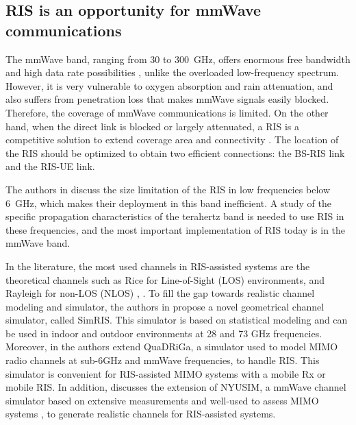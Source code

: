 \documentclass[conference]{IEEEtran}
\begin{document}


 

\subsection{RIS is an opportunity for mmWave communications}
The mmWave band, ranging from 30 to 300~GHz, offers enormous free bandwidth and high data rate possibilities  \cite{9350499}, unlike the overloaded low-frequency spectrum. However, it is very vulnerable to oxygen absorption and rain attenuation, and also suffers from penetration loss that makes mmWave signals easily blocked. Therefore, the coverage of mmWave communications is limited\cite{9568459}. On the other hand,  when the direct link is blocked or largely attenuated, a RIS is a competitive solution to extend  coverage area and connectivity \cite{9201413}. The location of the RIS should be optimized to obtain two efficient connections: the BS-RIS link and the RIS-UE link. 

The authors in \cite{9824117} discuss the size limitation of the RIS in low frequencies below 6~GHz, which makes their deployment in this band inefficient. A study of the specific propagation characteristics of the terahertz  band is needed to use RIS in these frequencies, and the most important implementation of RIS today is in the mmWave band. 
 
In the literature, the most used channels in RIS-assisted systems are the theoretical channels  such as Rice for Line-of-Sight (LOS) environments, and Rayleigh for non-LOS (NLOS) \cite{8982186}, \cite{9738798}. To fill the gap towards realistic channel modeling and simulator, the authors in \cite{9397266}  propose a novel geometrical  channel simulator, called SimRIS. This simulator is based on statistical modeling and can be used in indoor and outdoor environments at 28 and 73 GHz frequencies. Moreover, in \cite{dorokhin2022reconfigurable}
the authors extend QuaDRiGa, a simulator used to model MIMO radio channels at sub-6GHz and mmWave frequencies,  to handle RIS. This simulator  is convenient for RIS-assisted MIMO systems with  a  mobile Rx or mobile RIS. In addition, \cite{habib2023extended} discusses the extension of NYUSIM, a mmWave channel simulator based on extensive measurements and well-used to assess MIMO systems \cite{el2018performance,khaled2019performance,khaled2021multi}, to generate realistic channels for RIS-assisted systems.
\end{document}
